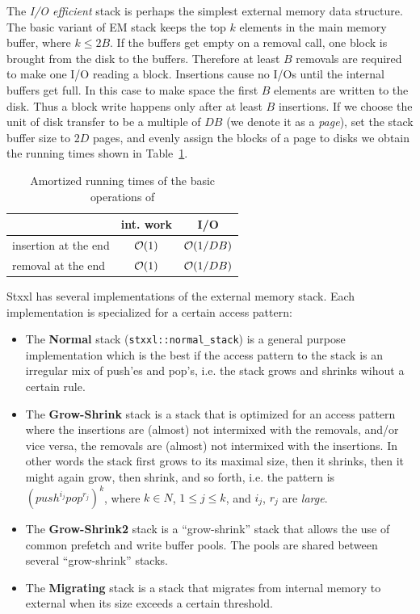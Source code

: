 \documentclass[twoside]{book}
\newcommand{\stxxl}{{\sc Stxxl} }
\begin{document}
The \emph{I/O efficient} stack is perhaps the simplest external memory
data structure. The basic variant of EM stack keeps the top $k$
elements in the main memory buffer, where $k \leq 2B$. If the buffers
get empty on a removal call, one block is brought from the disk to the
buffers. Therefore at least $B$ removals are required to make one I/O
reading a block. Insertions cause no I/Os until the internal buffers
get full. In this case to make space the first $B$ elements are
written to the disk. Thus a block write happens only after at least
$B$ insertions. If we choose the unit of disk
transfer to be a multiple of $DB$ (we denote it as a \emph{page}), set the
stack buffer size to $2D$ pages, and evenly assign the blocks of a
page to disks we obtain the running times shown in
Table~\ref{rtstack}. 

\begin{table}[h]
\begin{center}
\caption{Amortized running times of the basic operations of \xstack}
\label{rtstack}
\begin{tabular}{|l|c|c|}
\hline
                    & int. work & I/O \\
\hline\hline
insertion at the end& $\mathcal{O}\!\left( 1\right)$ & $\mathcal{O}\!\left( 1/DB\right)$\\
\hline
removal at the end  & $\mathcal{O}\!\left( 1\right)$ & $\mathcal{O}\!\left( 1/DB\right)$ \\
\hline
\end{tabular}
\end{center}
\end{table}

\stxxl has several implementations of the external memory stack. Each 
implementation is specialized for a certain access pattern:
\begin{itemize}
\item The {\bf Normal } stack (\texttt{stxxl::normal\_stack}) is a general
purpose implementation which is the best if the access pattern
to the stack is an irregular mix of push'es and pop's, i.e. the stack
grows and shrinks wihout a certain rule.
\item The {\bf Grow-Shrink} stack is a stack that is optimized for an
access pattern where the insertions are (almost) not intermixed with
the removals, and/or vice versa, the removals are (almost) not
intermixed with the insertions. In other words the stack first grows
to its maximal size, then it shrinks, then it might again grow, then
shrink, and so forth, i.e. the pattern is
$(push^{i_j}pop^{r_j})^k$, where $k \in N$, $1\leq j\leq k$, and
$i_j$, $r_j$ are \emph{large}. 
\item The {\bf Grow-Shrink2} stack is a ``grow-shrink'' stack that
allows the use of common prefetch and write buffer pools. The pools
are shared between several ``grow-shrink'' stacks.
\item The {\bf Migrating} stack is a stack that migrates from
internal memory to external when its size exceeds a certain
threshold. 
\end{itemize}
\end{document}
